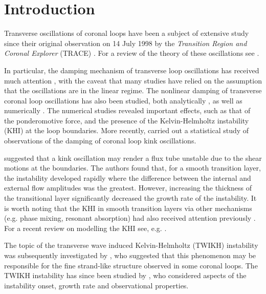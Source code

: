 \section{Introduction}
\label{sec:c3intro}

Transverse oscillations of coronal loops have been a subject of extensive study since their original observation on 14 July 1998 by the \textit{Transition Region and Coronal Explorer} (TRACE) \citep{Aschwanden1999, Nakariakov1999}. For a review of the theory of these oscillations see \cite{Ruderman2009}.

In particular, the damping mechanism of transverse loop oscillations has received much attention \citep[e.g.][]{Ruderman2002, Goossens2002, TVD2004, Dymova2006, Williamson2014}, with the caveat that many studies have relied on the assumption that the oscillations are in the linear regime.
The nonlinear damping of transverse coronal loop oscillations has also been studied, both analytically \citep{Ruderman2010b, Ruderman2014, Ruderman2017}, as well as numerically \citep[e.g.][]{Terradas2004, Magyar2016a}.
The numerical studies revealed important effects, such as that of the ponderomotive force, and the presence of the Kelvin-Helmholtz instability (KHI) at the loop boundaries.
More recently, \cite{Goddard2016} carried out a statistical study of observations of the damping of coronal loop kink oscillations.

\cite{Terradas2008} suggested that a kink oscillation may render a flux tube unstable due to the shear motions at the boundaries.
The authors found that, for a smooth transition layer, the instability developed rapidly where the difference between the internal and external flow amplitudes was the greatest.
However, increasing the thickness of the transitional layer significantly decreased the growth rate of the instability.
It is worth noting that the KHI in smooth transition layers via other mechanisms (e.g. phase mixing, resonant absorption) had also received attention previously \citep[see, for example,][]{Heyvaerts1983, Ofman1994, Poedts1997}.
For a recent review on modelling the KHI see, e.g. \cite{Zhelyazkov2015}.

The topic of the transverse wave induced Kelvin-Helmholtz (TWIKH) instability was subsequently investigated by \cite{Antolin2014}, who suggested that this phenomenon may be responsible for the fine strand-like structure observed in some coronal loops.
The TWIKH instability has since been studied by \cite{Antolin2016, Magyar2016a, Magyar2016b, Karampelas2017, Howson2017a, Howson2017b, Karampelas2018}, who considered aspects of the instability onset, growth rate and observational properties.

